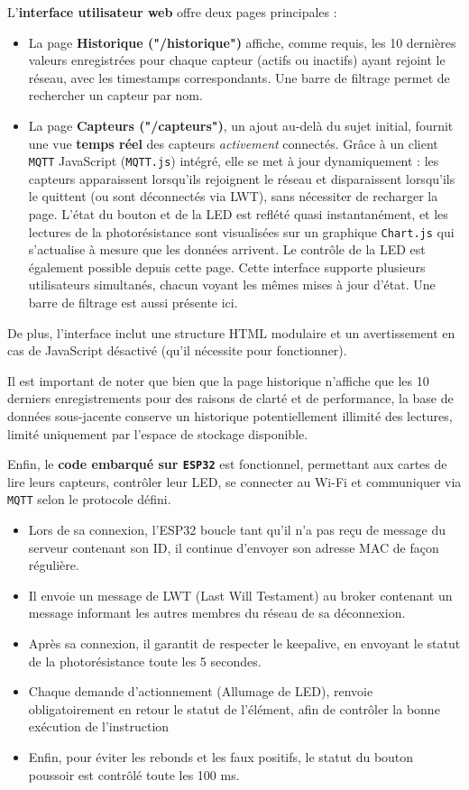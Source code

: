\documentclass[12pt]{article}
\begin{document}
L'\textbf{interface utilisateur web} offre deux pages principales :
\begin{itemize}
    \item La page \textbf{Historique ("/historique")} affiche, comme requis, les 10 dernières valeurs enregistrées pour chaque capteur (actifs ou inactifs) ayant rejoint le réseau, avec les timestamps correspondants. Une barre de filtrage permet de rechercher un capteur par nom.
    \item La page \textbf{Capteurs ("/capteurs")}, un ajout au-delà du sujet initial, fournit une vue \textbf{temps réel} des capteurs \textit{activement} connectés. Grâce à un client \texttt{MQTT} JavaScript (\texttt{MQTT.js}) intégré, elle se met à jour dynamiquement : les capteurs apparaissent lorsqu'ils rejoignent le réseau et disparaissent lorsqu'ils le quittent (ou sont déconnectés via LWT), sans nécessiter de recharger la page. L'état du bouton et de la LED est reflété quasi instantanément, et les lectures de la photorésistance sont visualisées sur un graphique \texttt{Chart.js} qui s'actualise à mesure que les données arrivent. Le contrôle de la LED est également possible depuis cette page. Cette interface supporte plusieurs utilisateurs simultanés, chacun voyant les mêmes mises à jour d'état. Une barre de filtrage est aussi présente ici.
\end{itemize}
De plus, l'interface inclut une structure HTML modulaire et un avertissement en cas de JavaScript désactivé (qu'il
nécessite pour fonctionner).

Il est important de noter que bien que la page historique n'affiche que les 10 derniers enregistrements pour des raisons de clarté et de performance, la base de données sous-jacente conserve un historique potentiellement illimité des lectures, limité uniquement par l'espace de stockage disponible.

Enfin, le \textbf{code embarqué sur \texttt{ESP32}} est fonctionnel, permettant aux cartes de lire leurs capteurs, contrôler leur LED, se connecter au Wi-Fi et communiquer via \texttt{MQTT} selon le protocole défini.
\begin{itemize}
\item Lors de sa connexion, l'ESP32 boucle tant qu'il n'a pas reçu de message du serveur contenant son ID, il continue d'envoyer son adresse MAC de façon régulière.
\item Il envoie un message de LWT (Last Will Testament) au broker contenant un message informant les autres membres du réseau de sa déconnexion.
\item Après sa connexion, il garantit de respecter le keepalive, en envoyant le statut de la photorésistance toute les 5 secondes.
\item Chaque demande d'actionnement (Allumage de LED), renvoie obligatoirement en retour le statut de l'élément, afin de contrôler la bonne exécution de l'instruction
\item Enfin, pour éviter les rebonds et les faux positifs, le statut du bouton poussoir est contrôlé toute les 100 ms.
\end{itemize}
\end{document}
